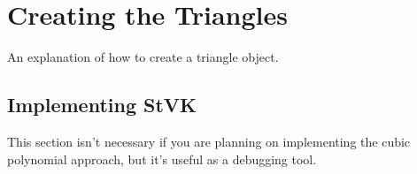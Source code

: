 \documentclass[twocolumn,10pt]{asme2ej}
\begin{document}
%
%
%
%
%
%
\section{Creating the Triangles}

An explanation of how to create a triangle object.

\subsection{Implementing StVK}

This section isn't necessary if you are planning on implementing the cubic polynomial approach, but it's useful
as a debugging tool.
\end{document}
